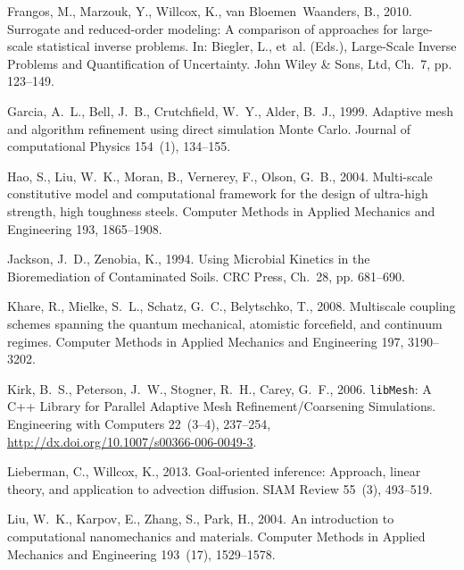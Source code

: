 \documentclass[review,sort&compress]{elsarticle}
\begin{document}
\begin{thebibliography}{42}
Frangos, M., Marzouk, Y., Willcox, K., van Bloemen~Waanders, B., 2010.
  Surrogate and reduced-order modeling: A comparison of approaches for
  large-scale statistical inverse problems. In: Biegler, L., et~al. (Eds.),
  Large-Scale Inverse Problems and Quantification of Uncertainty. John Wiley \&
  Sons, Ltd, Ch.~7, pp. 123--149.

Garcia, A.~L., Bell, J.~B., Crutchfield, W.~Y., Alder, B.~J., 1999. Adaptive
  mesh and algorithm refinement using direct simulation {M}onte {C}arlo.
  Journal of computational Physics 154~(1), 134--155.

Hao, S., Liu, W.~K., Moran, B., Vernerey, F., Olson, G.~B., 2004. Multi-scale
  constitutive model and computational framework for the design of ultra-high
  strength, high toughness steels. Computer Methods in Applied Mechanics and
  Engineering 193, 1865--1908.

Jackson, J.~D., Zenobia, K., 1994. Using Microbial Kinetics in the
  Bioremediation of Contaminated Soils. CRC Press, Ch.~28, pp. 681--690.

Khare, R., Mielke, S.~L., Schatz, G.~C., Belytschko, T., 2008. Multiscale
  coupling schemes spanning the quantum mechanical, atomistic forcefield, and
  continuum regimes. Computer Methods in Applied Mechanics and Engineering 197,
  3190--3202.

Kirk, B.~S., Peterson, J.~W., Stogner, R.~H., Carey, G.~F., 2006.
  {\texttt{libMesh}: A {C}++ Library for Parallel Adaptive Mesh
  Refinement/Coarsening Simulations}. Engineering with Computers 22~(3--4),
  237--254, \url{http://dx.doi.org/10.1007/s00366-006-0049-3}.

Lieberman, C., Willcox, K., 2013. Goal-oriented inference: Approach, linear
  theory, and application to advection diffusion. SIAM Review 55~(3), 493--519.

Liu, W.~K., Karpov, E., Zhang, S., Park, H., 2004. An introduction to
  computational nanomechanics and materials. Computer Methods in Applied
  Mechanics and Engineering 193~(17), 1529--1578.


\end{thebibliography}
\end{document}
